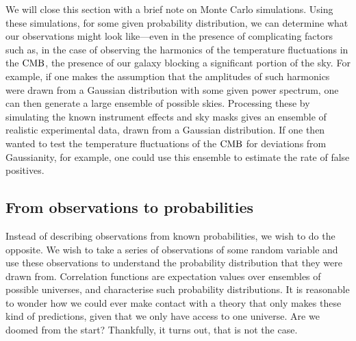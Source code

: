     We will close this section with a brief note on Monte Carlo simulations.
    Using these simulations, for some given probability distribution, we can determine
    what our observations might look like---even in the presence of
    complicating factors such as, in the case of observing the harmonics of the temperature fluctuations
    in the $\text{CMB}$, the presence of our galaxy blocking a significant portion
    of the sky.
    For example, if one makes the assumption that the amplitudes of
    such harmonics were drawn from a Gaussian distribution with some given power spectrum,
    one can then generate a large ensemble of possible skies.
    Processing these by simulating the known instrument effects and
    sky masks gives an ensemble of realistic experimental data, drawn
    from a Gaussian distribution. If one then wanted to test the temperature
    fluctuations of the $\text{CMB}$ for deviations from Gaussianity,
    for example, one could use this ensemble to estimate the rate of false positives.



\subsection{From observations to probabilities}
    Instead of describing observations from known probabilities,
    we wish to do the opposite.
    We wish to take a series of observations of some random variable and use these observations
    to understand the probability distribution that they were drawn from.
    Correlation functions are expectation values over ensembles of possible
    universes, and characterise such probability distributions.
    It is reasonable to wonder how we could ever make contact with a theory
    that only makes these kind of predictions, given that we only have access to one universe.
    Are we doomed from the start? Thankfully, it turns out, that is not the case.


